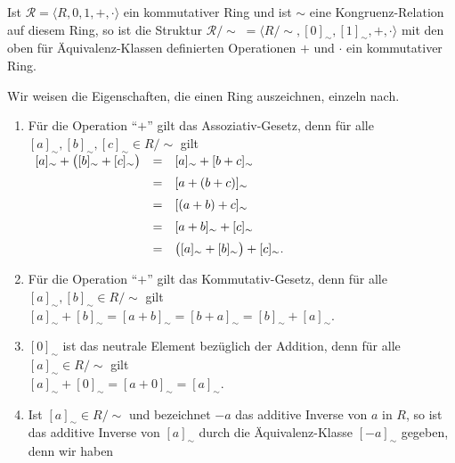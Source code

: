 \begin{Satz} \label{satz:faktor_ring} 
  Ist $\mathcal{R} = \langle R, 0, 1, +, \cdot \rangle$ ein kommutativer Ring und ist
  $\sim$ eine Kongruenz-Relation auf diesem Ring, so ist die Struktur 
  $\mathcal{R}/\!\!\sim\; = \langle R/\!\sim, [0]_\sim, [1]_\sim, +, \cdot \rangle$
  mit den oben f\"{u}r \"{A}quivalenz-Klassen definierten Operationen $+$ und $\cdot$ ein kommutativer 
  Ring.  
\end{Satz}

\proof
Wir weisen die Eigenschaften, die einen Ring auszeichnen, einzeln nach.
\begin{enumerate}
\item F\"{u}r die Operation ``$+$'' gilt das Assoziativ-Gesetz, denn f\"{u}r alle 
      $[a]_\sim, [b]_\sim, [c]_\sim \in R/\!\sim$ gilt
      \\[0.2cm]
      \hspace*{1.3cm}
      $
      \begin{array}[t]{lcl}
            [a]_\sim + \bigl([b]_\sim + [c]_\sim\bigr) 
      & = & [a]_\sim + [b + c]_\sim                     \\[0.2cm]
      & = & [a + (b + c)]_\sim                          \\[0.2cm]
      & = & [(a + b) + c]_\sim                          \\[0.2cm]
      & = & [a + b]_\sim + [c]_\sim                     \\[0.2cm]
      & = & \bigl([a]_\sim + [b]_\sim\bigr) + [c]_\sim. 
      \end{array}
      $
\item F\"{u}r die Operation ``$+$'' gilt das Kommutativ-Gesetz, denn f\"{u}r alle $[a]_\sim, [b]_\sim \in R/\!\sim$ gilt
      \\[0.2cm]
      \hspace*{1.3cm}
      $[a]_\sim + [b]_\sim = [a + b]_\sim = [b + a]_\sim = [b]_\sim + [a]_\sim$.
\item $[0]_\sim$ ist das neutrale Element bez\"{u}glich der Addition, denn f\"{u}r alle $[a]_\sim \in R/\!\sim$ gilt
      \\[0.2cm]
      \hspace*{1.3cm}
      $[a]_\sim + [0]_\sim = [a + 0]_\sim = [a]_\sim$.
\item Ist $[a]_\sim \in R/\!\sim$ und bezeichnet $-a$ das additive Inverse von $a$ in $R$, so ist das
      additive Inverse von  $[a]_\sim$ durch 
      die \"{A}quivalenz-Klasse $[-a]_\sim$ gegeben, denn wir haben
      \\[0.2cm]

\end{enumerate}
